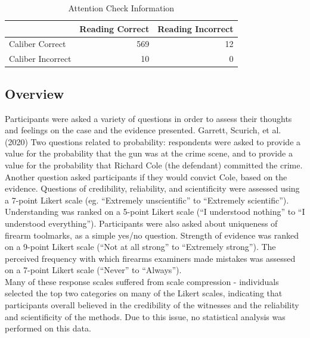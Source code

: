 \documentclass[print]{nuthesis}
\begin{document}
\begin{table}

\caption{\label{tab:attentioncheck}Attention Check Information}
\centering
\begin{tabular}[t]{l|r|r}
\hline
  & Reading Correct & Reading Incorrect\\
\hline
Caliber Correct & 569 & 12\\
\hline
Caliber Incorrect & 10 & 0\\
\hline
\end{tabular}
\end{table}

\hypertarget{overview}{%
\subsection{Overview}\label{overview}}

Participants were asked a variety of questions in order to assess their thoughts and feelings on the case and the evidence presented.
 Garrett, Scurich, et al. (2020) 
Two questions related to probability: respondents were asked to provide a value for the probability that the gun was at the crime scene, and to provide a value for the probability that Richard Cole (the defendant) committed the crime.
Another question asked participants if they would convict Cole, based on the evidence.
Questions of credibility, reliability, and scientificity were assessed using a 7-point Likert scale (eg. ``Extremely unscientific'' to ``Extremely scientific'').
Understanding was ranked on a 5-point Likert scale (``I understood nothing'' to ``I understood everything'').
Participants were also asked about uniqueness of firearm toolmarks, as a simple yes/no question.
Strength of evidence was ranked on a 9-point Likert scale (``Not at all strong'' to ``Extremely strong''). The perceived frequency with which firearms examiners made mistakes was assessed on a 7-point Likert scale (``Never'' to ``Always'').\\
Many of these response scales suffered from scale compression - individuals selected the top two categories on many of the Likert scales, indicating that participants overall believed in the credibility of the witnesses and the reliability and scientificity of the methods.
Due to this issue, no statistical analysis was performed on this data.
\end{document}
